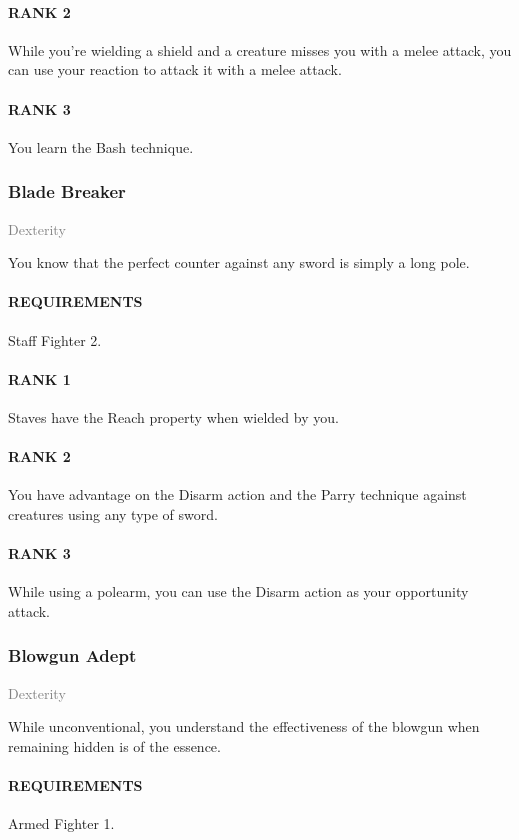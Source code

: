 \paragraph{RANK 2} While you're wielding a shield and a creature misses you with a melee attack, you can use your reaction to attack it with a melee attack.
\paragraph{RANK 3} You learn the Bash technique.

\subsubsection{Blade Breaker} \label{feat::bladebreaker}
\small{\textcolor{gray}{Dexterity}}

\normalsize
You know that the perfect counter against any sword is simply a long pole.
\paragraph{REQUIREMENTS} Staff Fighter 2.
\paragraph{RANK 1} Staves have the Reach property when wielded by you.
\paragraph{RANK 2} You have advantage on the Disarm action and the Parry technique against creatures using any type of sword.
\paragraph{RANK 3} While using a polearm, you can use the Disarm action as your opportunity attack.

\subsubsection{Blowgun Adept} \label{feat::blowgunadept}
\small{\textcolor{gray}{Dexterity}}

\normalsize
While unconventional, you understand the effectiveness of the blowgun when remaining hidden is of the essence.
\paragraph{REQUIREMENTS} Armed Fighter 1.
